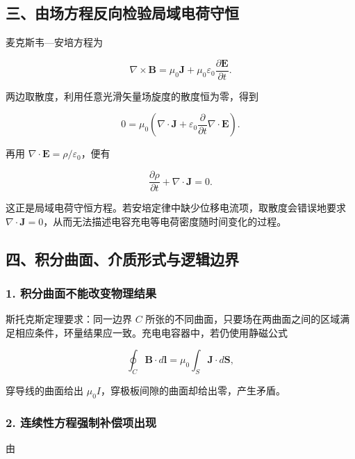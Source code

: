 \subsection{三、由场方程反向检验局域电荷守恒}\label{m7:ux4e09ux7531ux573aux65b9ux7a0bux53cdux5411ux68c0ux9a8cux5c40ux57dfux7535ux8377ux5b88ux6052}

麦克斯韦---安培方程为

\[
\nabla\times\mathbf B
=\mu_0\mathbf J+\mu_0\varepsilon_0\frac{\partial\mathbf E}{\partial t}.
\]

两边取散度，利用任意光滑矢量场旋度的散度恒为零，得到

\[
0=\mu_0\left(\nabla\cdot\mathbf J
+\varepsilon_0\frac{\partial}{\partial t}\nabla\cdot\mathbf E\right).
\]

再用 \(\nabla\cdot\mathbf E=\rho/\varepsilon_0\)，便有

\[
\boxed{\frac{\partial\rho}{\partial t}+\nabla\cdot\mathbf J=0}.
\]

这正是局域电荷守恒方程。若安培定律中缺少位移电流项，取散度会错误地要求
\(\nabla\cdot\mathbf J=0\)，从而无法描述电容充电等电荷密度随时间变化的过程。

\subsection{四、积分曲面、介质形式与逻辑边界}\label{m7:ux56dbux79efux5206ux66f2ux9762ux4ecbux8d28ux5f62ux5f0fux4e0eux903bux8f91ux8fb9ux754c}

\subsubsection{1.
积分曲面不能改变物理结果}\label{m7:ux79efux5206ux66f2ux9762ux4e0dux80fdux6539ux53d8ux7269ux7406ux7ed3ux679c}

斯托克斯定理要求：同一边界 \(C\)
所张的不同曲面，只要场在两曲面之间的区域满足相应条件，环量结果应一致。充电电容器中，若仍使用静磁公式

\[
\oint_C\mathbf B\cdot d\mathbf l
=\mu_0\int_S\mathbf J\cdot d\mathbf S,
\]

穿导线的曲面给出 \(\mu_0I\)，穿极板间隙的曲面却给出零，产生矛盾。

\subsubsection{2.
连续性方程强制补偿项出现}\label{m7:ux8fdeux7eedux6027ux65b9ux7a0bux5f3aux5236ux8865ux507fux9879ux51faux73b0}

由

